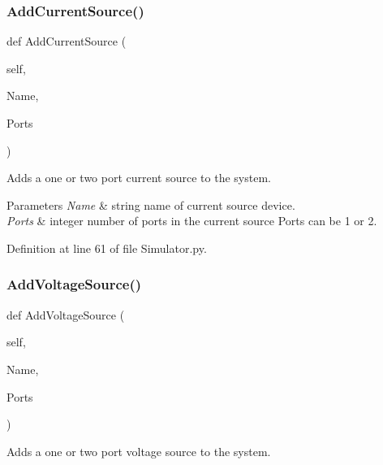 \subsubsection{\texorpdfstring{Add\+Current\+Source()}{AddCurrentSource()}}
{\footnotesize\ttfamily def Add\+Current\+Source (\begin{DoxyParamCaption}\item[{}]{self,  }\item[{}]{Name,  }\item[{}]{Ports }\end{DoxyParamCaption})}



Adds a one or two port current source to the system. 


\begin{DoxyParams}{Parameters}
{\em Name} & string name of current source device. \\
\hline
{\em Ports} & integer number of ports in the current source Ports can be 1 or 2. \\
\hline
\end{DoxyParams}


Definition at line 61 of file Simulator.\+py.

\mbox{\label{classSignalIntegrity_1_1SystemDescriptions_1_1Simulator_1_1Simulator_ade4e57186554be52881092b572eac2ba}} 
\subsubsection{\texorpdfstring{Add\+Voltage\+Source()}{AddVoltageSource()}}
{\footnotesize\ttfamily def Add\+Voltage\+Source (\begin{DoxyParamCaption}\item[{}]{self,  }\item[{}]{Name,  }\item[{}]{Ports }\end{DoxyParamCaption})}



Adds a one or two port voltage source to the system. 


